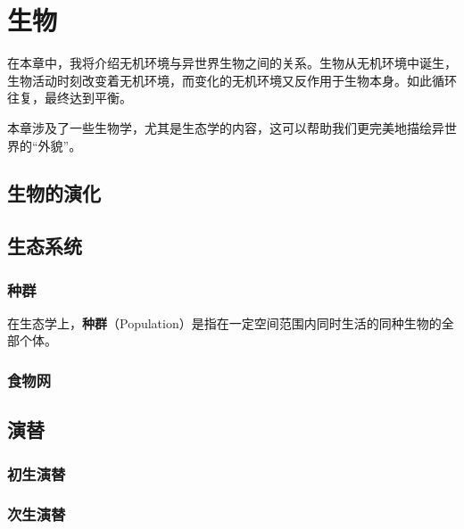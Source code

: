 \chapter{生物}
在本章中，我将介绍无机环境与异世界生物之间的关系。生物从无机环境中诞生，生物活动时刻改变着无机环境，而变化的无机环境又反作用于生物本身。如此循环往复，最终达到平衡。

本章涉及了一些生物学，尤其是生态学的内容，这可以帮助我们更完美地描绘异世界的“外貌”。

\section{生物的演化}

\section{生态系统}

\subsection{种群}
在生态学上，\textbf{种群}（Population）是指在一定空间范围内同时生活的同种生物的全部个体。

\subsection{食物网}

\section{演替}

\subsection{初生演替}

\subsection{次生演替}
